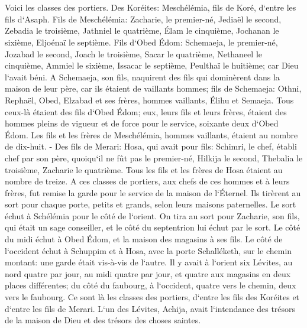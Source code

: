 \chapter{}

\verse Voici les classes des portiers. Des Koréites: Meschélémia, fils de Koré, d`entre les fils d`Asaph. 
\verse Fils de Meschélémia: Zacharie, le premier-né, Jediaël le second, Zebadia le troisième, Jathniel le quatrième, 
\verse Élam le cinquième, Jochanan le sixième, Eljoénaï le septième. 
\verse Fils d`Obed Édom: Schemaeja, le premier-né, Jozabad le second, Joach le troisième, Sacar le quatrième, Nethaneel le cinquième, 
\verse Ammiel le sixième, Issacar le septième, Peulthaï le huitième; car Dieu l`avait béni. 
\verse A Schemaeja, son fils, naquirent des fils qui dominèrent dans la maison de leur père, car ils étaient de vaillants hommes; 
\verse fils de Schemaeja: Othni, Rephaël, Obed, Elzabad et ses frères, hommes vaillants, Élihu et Semaeja. 
\verse Tous ceux-là étaient des fils d`Obed Édom; eux, leurs fils et leurs frères, étaient des hommes pleins de vigueur et de force pour le service, soixante deux d`Obed Édom. 
\verse Les fils et les frères de Meschélémia, hommes vaillants, étaient au nombre de dix-huit. - 
\verse Des fils de Merari: Hosa, qui avait pour fils: Schimri, le chef, établi chef par son père, quoiqu`il ne fût pas le premier-né, 
\verse Hilkija le second, Thebalia le troisième, Zacharie le quatrième. Tous les fils et les frères de Hosa étaient au nombre de treize. 
\verse A ces classes de portiers, aux chefs de ces hommes et à leurs frères, fut remise la garde pour le service de la maison de l`Éternel. 
\verse Ils tirèrent au sort pour chaque porte, petits et grands, selon leurs maisons paternelles. 
\verse Le sort échut à Schélémia pour le côté de l`orient. On tira au sort pour Zacharie, son fils, qui était un sage conseiller, et le côté du septentrion lui échut par le sort. 
\verse Le côté du midi échut à Obed Édom, et la maison des magasins à ses fils. 
\verse Le côté de l`occident échut à Schuppim et à Hosa, avec la porte Schalléketh, sur le chemin montant: une garde était vis-à-vis de l`autre. 
\verse Il y avait à l`orient six Lévites, au nord quatre par jour, au midi quatre par jour, et quatre aux magasins en deux places différentes; 
\verse du côté du faubourg, à l`occident, quatre vers le chemin, deux vers le faubourg. 
\verse Ce sont là les classes des portiers, d`entre les fils des Koréites et d`entre les fils de Merari. 
\verse L`un des Lévites, Achija, avait l`intendance des trésors de la maison de Dieu et des trésors des choses saintes. 
